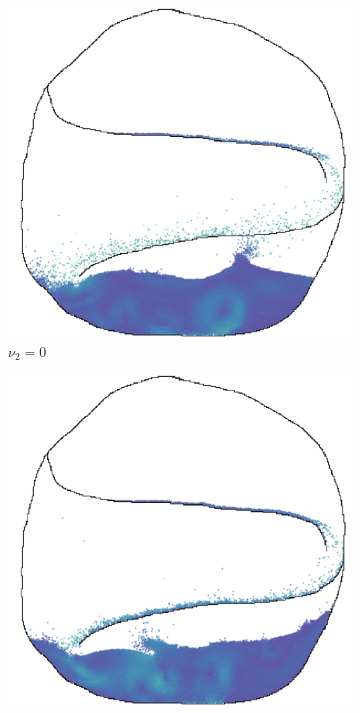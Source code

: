 \begin{figure}
  \centering
  \begin{subfigure}[t]{0.49\textwidth}
    \centering
    \includegraphics*[width=\textwidth]{images/boundary/00044-no-adhesion-crop.jpg}
    \caption{$\nu_2=0$}
  \end{subfigure}%
  \begin{subfigure}[t]{0.49\textwidth}
    \centering
    \includegraphics*[width=\textwidth]{images/boundary/00044-adhesion-crop.jpg}

\end{subfigure}
\end{figure}
